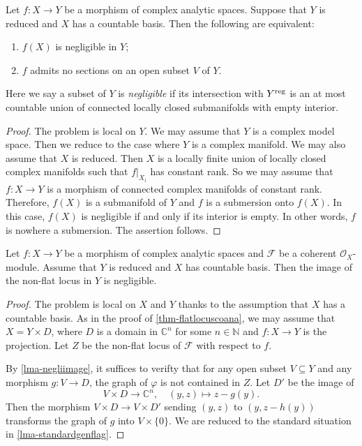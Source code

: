 \begin{lemma}\label{lma-negliimage}
    Let $f:X\rightarrow Y$ be a morphism of complex analytic spaces. Suppose that $Y$ is reduced and $X$ has a countable basis. Then the following are equivalent:
    \begin{enumerate}
        \item $f(X)$ is negligible in $Y$;
        \item $f$ admits no sections on an open subset $V$ of $Y$.
    \end{enumerate}
\end{lemma}
Here we say a subset of $Y$ is \emph{negligible} if its intersection with $Y^{\operatorname{reg}}$ is an at most countable union of connected locally closed submanifolds with empty interior.

\begin{proof}
   The problem is local on $Y$. We may assume that $Y$ is a complex model space. Then we reduce to the case where $Y$ is a complex manifold. We may also assume that $X$ is reduced. Then $X$ is a locally finite union of locally closed complex manifolds such that $f|_{X_i}$ has constant rank. So we may assume that $f:X\rightarrow Y$ is a morphism of connected complex manifolds of constant rank. Therefore, $f(X)$ is a submanifold of $Y$ and $f$ is a submersion onto $f(X)$. In this case, $f(X)$ is negligible if and only if its interior is empty. In other words, $f$ is nowhere a submersion. The assertion follows.
\end{proof}

\begin{theorem}\label{thm-genflatness1}
    Let $f:X\rightarrow Y$ be a morphism of complex analytic spaces and $\mathcal{F}$ be a coherent $\mathcal{O}_X$-module. Assume that $Y$ is reduced and $X$ has countable basis. Then the image of the non-flat locus in $Y$ is negligible.
\end{theorem}
\begin{proof}
    The problem is local on $X$ and $Y$ thanks to the assumption that $X$ has a countable basis. As in the proof of \cref{thm-flatlocuscoana}, we may assume that $X=Y\times D$, where $D$ is a domain in $\mathbb{C}^n$ for some $n\in \mathbb{N}$ and $f:X\rightarrow Y$ is the projection. Let $Z$ be the non-flat locus of $\mathcal{F}$ with respect to $f$.

    By \cref{lma-negliimage}, it suffices to verifty that for any open subset $V\subseteq Y$ and any morphism $g:V\rightarrow D$, the graph of $\varphi$ is not contained in $Z$. Let $D'$ be the image of 
    \[
        V\times D\rightarrow \mathbb{C}^n,\quad (y,z)\mapsto z-g(y).  
    \]
    Then the morphism $V\times D\rightarrow V\times D'$ sending $(y,z)$ to $(y,z-h(y))$ transforms the graph of $g$ into $V\times \{0\}$. We are reduced to the standard situation in \cref{lma-standardgenflag}.
\end{proof}


